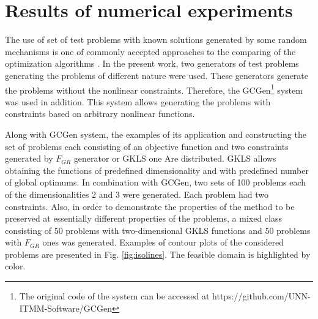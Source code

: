 \documentclass[runningheads]{llncs}
\begin{document}
\section{Results of numerical experiments}
\label{sec:exps}

The use of set of test problems with known solutions generated by some random mechanisms is
one of commonly accepted approaches to the comparing of the optimization algorithms
\cite{Beiranvand2017}.
In the present work, two generators of test problems generating the problems of different nature
\cite{grishaginClass, Gaviano2003} were used.
These generators generate the problems without the nonlinear constraints. Therefore, the
GCGen\footnote{The original code of the system can be accessed at https://github.com/UNN-
ITMM-Software/GCGen} \cite{GergelBarkalov2019} system was used in addition.
This system allows generating the problems with constraints based on arbitrary nonlinear
functions.

Along with GCGen system, the examples of its application and constructing the set of problems
each consisting of an objective function and two constraints generated by \(F_{GR}\)
\cite{grishaginClass} generator or GKLS \cite{Gaviano2003} one Are distributed.
GKLS \cite{Gaviano2003} allows obtaining the functions of predefined dimensionality and
with predefined number of global optimums.
In combination with GCGen, two sets of 100 problems each of the dimensionalities 2 and 3
were generated.
Each problem had two constraints.
Also, in order to demonstrate the properties of the method to be preserved at essentially
different properties of the problems, a mixed class consisting of 50 problems with
two-dimensional GKLS functions and 50 problems with \(F_{GR}\) ones was generated.
Examples of contour plots of the considered problems are presented in Fig. \ref{fig:isolines}.
The feasible domain is highlighted by color.
\end{document}
